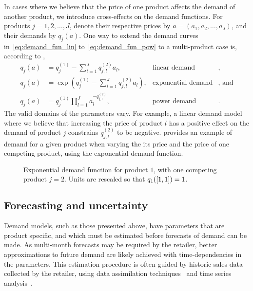 \documentclass[main.tex]{subfiles}
\begin{document}
In cases where we believe that the price of one product affects the
demand of another product, we introduce cross-effects on the demand
functions. For products $j=1,2,\dots,J$, denote their respective prices by
$a=(a_1,a_2,\dots,a_J)$, and their demands by $q_j(a)$.
One way to extend the demand curves in~\eqref{eq:demand_fun_lin}
to~\eqref{eq:demand_fun_pow} to a multi-product case is, according to \cite{talluri2006theory},
\begin{align}
  q_j(a)&=q_{j}^{(1)}-\sum_{l=1}^Jq_{j,l}^{(2)}a_l,
  &\text{linear demand}&,\\
  q_j(a)&=\exp\left( q_{j}^{(1)}-\sum_{l=1}^Jq_{j,l}^{(2)}a_l
          \right),
  &\text{exponential demand}&\text{, and}\\
  q_j(a)&=q_j^{(1)}\prod_{l=1}^Ja_l^{-q_{j,l}^{(2)}},
  &\text{power demand}&.
\end{align}
The valid domains of the parameters vary. For example, a linear demand
model where we believe that increasing the price of product $l$ has a
positive effect on the demand of product $j$ constrains
$q_{j,l}^{(2)}$ to be negative. 
provides an example of demand for a given product when varying the
its price and the price of one competing product, using the exponential demand function.

\begin{figure}[htbp]
  \centering
  \caption[Exponential demand function.]{Exponential demand function for product $1$, with one
    competing product $j=2$.
    Units are rescaled so that $q_1(\left[1,1\right])=1$.
  }\label{fig:demand_exponential_two}
\end{figure}

\subsection{Forecasting and uncertainty}
Demand models, such as those presented above, have parameters that are
product specific, and which must be estimated before forecasts of
demand can be made.
As multi-month forecasts may be required by the retailer, better
approximations to future demand are likely achieved with
time-dependencies in the parameters.
This estimation procedure is often guided by
historic sales data collected by the retailer, using data assimilation
techniques~\cite{law2015data} and time series analysis~\cite{chatfield2004analysis}.
\end{document}
